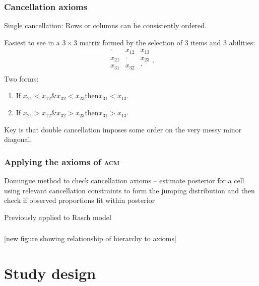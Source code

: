 \documentclass[10pt,serif,professionalfont]{beamer}
\begin{document}
\begin{frame} %
    \frametitle{Cancellation axioms}
    Single cancellation: Rows or columns can be consistently ordered.%

Easiest to see in a $3 \times 3$ matrix formed by the selection of 3 items and 3 abilities:
\[
\begin{array}{ccc}
  \cdot&x_{12} &x_{13}  \\
  x_{21}&\cdot&x_{23} \\
  x_{31} & x_{32}&\cdot\\
\end{array}.
\]
Two forms: 
\begin{enumerate}
\item If $x_{21}<x_{12} \& x_{32}<x_{23} \text{then} x_{31}<x_{13}$. 
\item If $x_{21}>x_{12} \& x_{32}>x_{23} \text{then} x_{31}>x_{13}$. 
\end{enumerate}
Key is that double cancellation imposes some order on the very messy minor diagonal.

\end{frame}

\begin{frame}
    \frametitle{Applying the axioms of \textsc{acm}}

    Domingue method to check cancellation axioms -- estimate posterior for a cell using relevant cancellation constraints to form the jumping distribution and then check if observed proportions fit within posterior%
    
    Previously applied to Rasch model

\end{frame}

\begin{frame}
    \frametitle{}

    [new figure showing relationship of hierarchy to axioms]

\end{frame}

\begin{frame}
    \frametitle{}

\end{frame}


\section{Study design}
\end{document}
